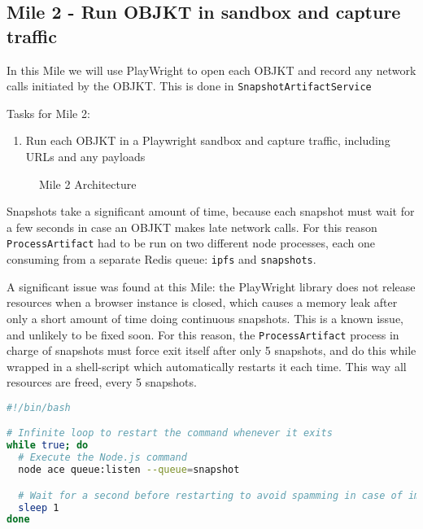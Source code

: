 \subsection {Mile 2 - Run OBJKT in sandbox and capture traffic}

In this Mile we will use PlayWright to open each OBJKT and record any network calls initiated by the OBJKT. This is done in \texttt{SnapshotArtifactService}

Tasks for Mile 2:
\begin{enumerate}
	\item Run each OBJKT in a Playwright sandbox and capture traffic, including URLs and any payloads
\end{enumerate}



\begin{figure}[h]
    \centering
    
    \caption[Mile 2 Architecture]{Mile 2 Architecture}
    \label{fig:mile2-arch}
\end{figure}


Snapshots take a significant amount of time, because each snapshot must wait for a few seconds in case an OBJKT makes late network calls. For this reason \texttt{ProcessArtifact} had to be run on two different node processes, each one consuming from a separate Redis queue: \texttt{ipfs} and \texttt{snapshots}.

A significant issue was found at this Mile: the PlayWright library does not release resources when a browser instance is closed, which causes a memory leak after only a short amount of time doing continuous snapshots. This is a known issue, and unlikely to be fixed soon. For this reason, the \texttt{ProcessArtifact} process in charge of snapshots must force exit itself after only 5 snapshots, and do this while wrapped in a shell-script which automatically restarts it each time. This way all resources are freed, every 5 snapshots.


\vspace{0.5cm}

\begin{lstlisting}[language=bash, caption={runSnapshotWorker.sh}] 
#!/bin/bash

# Infinite loop to restart the command whenever it exits
while true; do
  # Execute the Node.js command
  node ace queue:listen --queue=snapshot

  # Wait for a second before restarting to avoid spamming in case of immediate failure
  sleep 1
done
\end{lstlisting}


